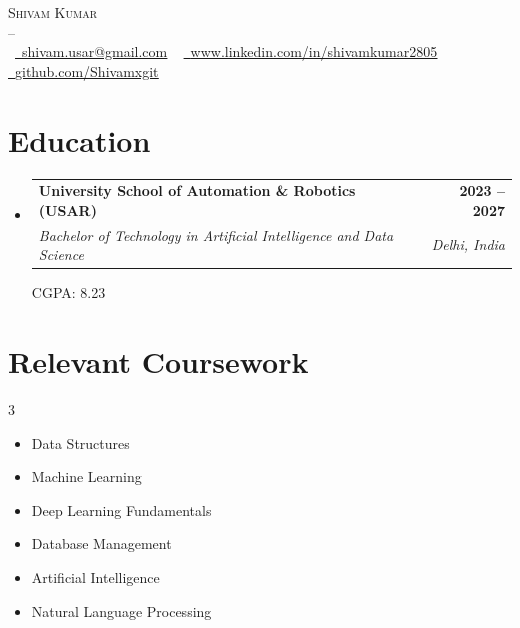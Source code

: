 \documentclass[letterpaper,11pt]{article}
\makeatletter
\newcommand{\resumeSubheading}[4]{
  \vspace{-2pt}\item
    \begin{tabular*}{1.0\textwidth}[t]{l@{\extracolsep{\fill}}r}
      \textbf{#1} & \textbf{\small #2} \\
      \textit{\small#3} & \textit{\small #4} \\
    \end{tabular*}\vspace{-7pt}
}
\newcommand{\resumeSubHeadingListStart}{\begin{itemize}[leftmargin=0.0in, label={}]}
\newcommand{\resumeSubHeadingListEnd}{\end{itemize}}
\makeatother
\begin{document}

\begin{center}
    {\Huge \scshape Shivam Kumar} \\ \vspace{1pt}
     --\\ \vspace{0.5pt}
 \small \raisebox{-0.1\height} ~\href{shivam.usar@gmail.com}{\raisebox{-0.2\height}\faEnvelope\  \underline{shivam.usar@gmail.com}} ~ 
    \href{www.linkedin.com/in/shivamkumar2805}{\raisebox{-0.2\height}\faLinkedin\ \underline{www.linkedin.com/in/shivamkumar2805}}  ~
    \href{https://github.com/}{\raisebox{-0.2\height}\faGithub\ \underline{github.com/Shivamxgit}}
    \vspace{-8pt}
\end{center}


\section{Education}
\resumeSubHeadingListStart
  \resumeSubheading
    {University School of Automation \& Robotics (USAR)}{2023 -- 2027}
    {Bachelor of Technology in Artificial Intelligence and Data Science}{Delhi, India}
    
    \vspace{1 pt}
    {\small {CGPA:} 8.23}
\resumeSubHeadingListEnd
\section{Relevant Coursework}
        \begin{multicols}{3}
            \begin{itemize}[itemsep=-5pt, parsep=3pt]
                \item\small Data Structures
                \item Machine Learning
                \item Deep Learning Fundamentals
                \item Database Management
                \item Artificial Intelligence
                \item Natural Language Processing
            \end{itemize}   
        \end{multicols}
        \vspace*{2.0\multicolsep}
\end{document}
